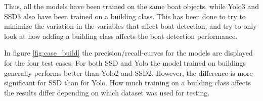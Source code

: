 \vspace{1mm}

Thus, all the models have been trained on the same boat objects, while Yolo3 and SSD3 also have been trained on a building class. This has been done to try to minimize the variation in the variables that affect boat detection, and try to only look at how adding a building class affects the boat detection performance.

\vspace{3mm}

In figure \ref{fig:case_build} the precision/recall-curves for the models are displayed for the four test cases. For both SSD and Yolo the model trained on buildings generally performs better than Yolo2 and SSD2. However, the difference is more significant for SSD than for Yolo. How much training on a building class affects the results differ depending on which dataset was used for testing. 

